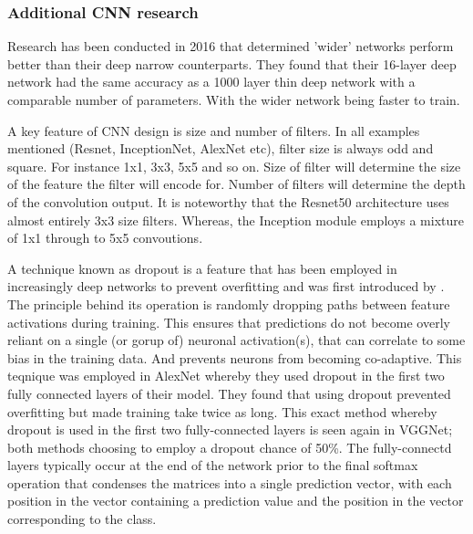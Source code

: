   \subsubsection{Additional CNN research}
    Research has been conducted in 2016 \cite{Zagoruyko} that determined 'wider' networks perform better than their deep narrow counterparts. They found that their 16-layer deep network had the same accuracy as a 1000 layer thin deep network with a comparable number of parameters. With the wider network being faster to train.
    \par
    A key feature of CNN design is size and number of filters. In all examples mentioned (Resnet, InceptionNet, AlexNet etc), filter size is always odd and square. For instance 1x1, 3x3, 5x5 and so on. Size of filter will determine the size of the feature the filter will encode for. Number of filters will determine the depth of the convolution output. It is noteworthy that the Resnet50 architecture \cite{He} uses almost entirely 3x3 size filters. Whereas, the Inception module employs a mixture of 1x1 through to 5x5 convoutions.
    \par
    A technique known as dropout is a feature that has been employed in increasingly deep networks to prevent overfitting and was first introduced by \cite{Srivastava2014}. The principle behind its operation is randomly dropping paths between feature activations during training. This ensures that predictions do not become overly reliant on a single (or gorup of) neuronal activation(s), that can correlate to some bias in the training data. And prevents neurons from becoming co-adaptive. This teqnique was employed in AlexNet \cite{Krizhevsky} whereby they used dropout in the first two fully connected layers of their model. They found that using dropout prevented overfitting but made training take twice as long. This exact method whereby dropout is used in the first two fully-connected layers is seen again in VGGNet\cite{Simonyan2015}; both methods choosing to employ a dropout chance of 50\%. The fully-connectd layers typically occur at the end of the network prior to the final softmax operation that condenses the matrices into a single prediction vector, with each position in the vector containing a prediction value and the position in the vector corresponding to the class.%
    \par
